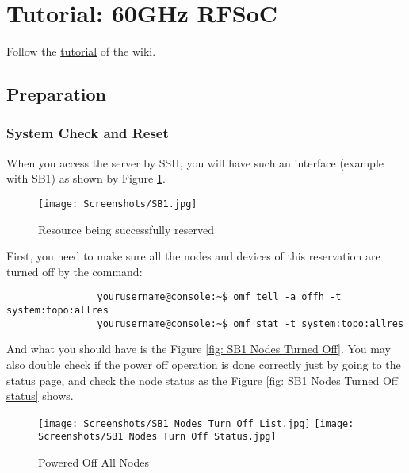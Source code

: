 \documentclass{article}
\begin{document}
    
\section{Tutorial: 60GHz RFSoC}
    Follow the \href{https://wiki.cosmos-lab.org/wiki/Tutorials/Wireless/mmwaveRFSoC}{tutorial} of the wiki. 
    \subsection{Preparation}
        \subsubsection{System Check and Reset}
            When you access the server by SSH, you will have such an interface (example with SB1) as shown by Figure \ref{fig: SB1 Lobby}. 
            \begin{figure}[ht]
                \centering
                \texttt{[image: Screenshots/SB1.jpg]}
                \caption{Resource being successfully reserved}
                \vspace*{0mm}
                \label{fig: SB1 Lobby}
            \end{figure}
            
            First, you need to make sure all the nodes and devices of this reservation are turned off by the command:
            \begin{verbatim}
                yourusername@console:~$ omf tell -a offh -t system:topo:allres
                yourusername@console:~$ omf stat -t system:topo:allres
            \end{verbatim}
            
            And what you should have is the Figure \ref{fig: SB1 Nodes Turned Off}. You may also double check if the power off operation is done correctly just by going to the \href{https://wiki.cosmos-lab.org/tractab/Status}{status} page, and check the node status as the Figure \ref{fig: SB1 Nodes Turned Off status} shows. 
            
            \begin{figure}[ht]
            	\captionsetup[subfigure]{position=bottom}
            	\centering
            	
                 {\texttt{[image: Screenshots/SB1 Nodes Turn Off List.jpg]}}
                \hspace{.05\linewidth}
                 {\texttt{[image: Screenshots/SB1 Nodes Turn Off Status.jpg]}}
                
                \caption{Powered Off All Nodes}    \label{fig: SB1 Nodes Turned Off Check}
            \end{figure}
\end{document}
